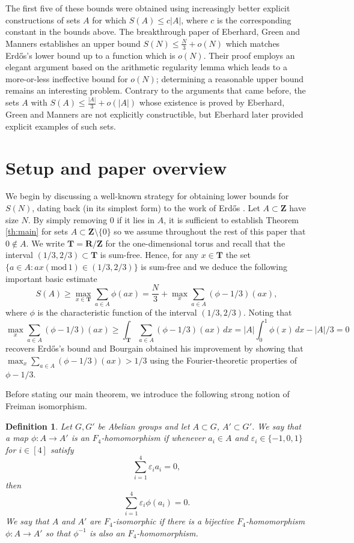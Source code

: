 \documentclass[11pt, reqno]{amsart}
\newtheorem{definition}[theorem]{Definition}
\newcommand{\md}[1]{\ensuremath{(\mbox{mod}\, #1)}}
\begin{document}
The first five of these bounds were obtained using increasingly better explicit constructions of sets $A$ for which $S(A)\leqslant c|A|$, where $c$ is the corresponding constant in the bounds above. The breakthrough paper of Eberhard, Green and Manners \cite{eberhardgreenmanners} establishes an upper bound $S(N)\leqslant \frac{N}{3}+o(N)$ which matches Erd\H{o}s's lower bound up to a function which is $o(N)$. Their proof employs an elegant argument based on the arithmetic regularity lemma which leads to a more-or-less ineffective bound for $o(N)$; determining a reasonable upper bound remains an interesting problem. Contrary to the arguments that came before, the sets $A$ with $S(A)\leqslant \frac{|A|}{3}+o(|A|)$ whose existence is proved by Eberhard, Green and Manners are not explicitly constructible, but Eberhard \cite{eberhard} later provided explicit examples of such sets. 

\section{Setup and paper overview}

We begin by discussing a well-known strategy for obtaining lower bounds for $S(N)$, dating back (in its simplest form) to the work of Erd\H{o}s \cite{erdos}. Let $A\subset\mathbf{Z}$ have size $N$. By simply removing $0$ if it lies in $A$, it is sufficient to establish Theorem \ref{th:main} for sets $A\subset\mathbf{Z}\setminus\{0\}$ so we assume throughout the rest of this paper that $0\notin A$. We write $\mathbf{T}=\mathbf{R}/\mathbf{Z}$ for the one-dimensional torus and recall that the interval $(1/3,2/3)\subset\mathbf{T}$ is sum-free. Hence, for any $x\in \mathbf{T}$ the set $\{a\in A: ax\md 1\in (1/3,2/3)\}$ is sum-free and we deduce the following important basic estimate
\begin{equation*}\label{basicestimate1}
    S(A)\geqslant\max_{x\in \mathbf{T}}\sum_{a\in A}\phi(ax)=\frac{N}{3}+\max_{x}\sum_{a\in A}(\phi-1/3)(ax),
\end{equation*}
where $\phi$ is the characteristic function of the interval $(1/3,2/3)$. Noting that $$\max_x\sum_{a\in A}(\phi-1/3)(ax)\geqslant\int_\mathbf{T}\sum_{a\in A}(\phi-1/3)(ax)\,dx=|A|\int_0^1\phi(x)\,dx-|A|/3=0$$ recovers Erd\H{o}s's bound and Bourgain obtained his improvement by showing that $\max_x\sum_{a\in A}(\phi-1/3)(ax)>1/3$ using the Fourier-theoretic properties of $\phi-1/3$. 

\medskip

Before stating our main theorem, we introduce the following strong notion of Freiman isomorphism.
\begin{definition}\label{def:F_4isomo}
Let $G,G'$ be Abelian groups and let $A\subset G$, $A'\subset G'$. We say that a map $\phi:A\to A'$ is an \textit{$F_4$-homomorphism} if whenever $a_i\in A$ and $\varepsilon_i\in\{-1,0,1\}$ for $i\in[4]$ satisfy $$\sum_{i=1}^4\varepsilon_ia_i=0,$$
then $$\sum_{i=1}^4\varepsilon_i\phi(a_i)=0.$$ We say that $A$ and $A'$ are \textit{$F_4$-isomorphic} if there is a bijective $F_4$-homomorphism $\phi:A\to A'$ so that $\phi^{-1}$ is also an $F_4$-homomorphism.
\label{frei}
\end{definition}
\end{document}

